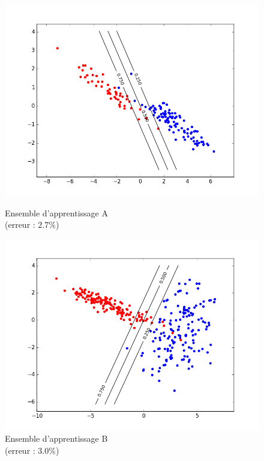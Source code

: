 \documentclass[paper=a4, fontsize=11pt]{article}
\begin{document}
\begin{figure}[h]
 \begin{minipage}[b]{.3\linewidth}
 \begin{center}
 \includegraphics[scale=0.25]{figures/log_reg_A_train.png}
  \caption*{Ensemble d'apprentissage A \\ (erreur : $2.7\%$)}
 \end{center}
 \end{minipage} \hfill
 \begin{minipage}[b]{.3\linewidth}
  \includegraphics[scale=0.25]{figures/log_reg_B_train.png}
  \caption*{Ensemble d'apprentissage B \\ (erreur : $3.0\%$)}
 \end{minipage} \hfill

\end{figure}
\end{document}
